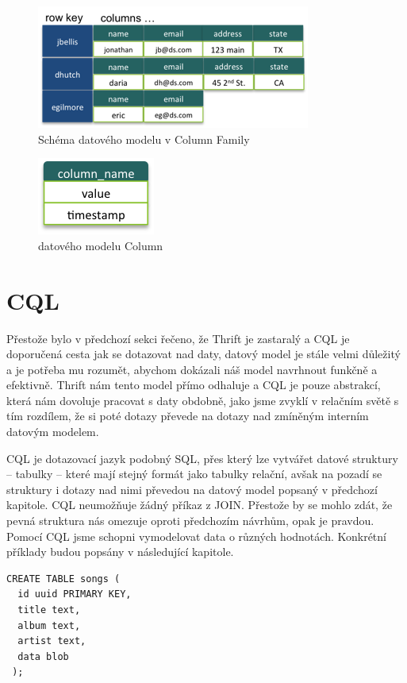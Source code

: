 \begin{figure}[!h]
\centering
\includegraphics[scale=0.95]{images/static_column_family}
\caption{Schéma datového modelu v Column Family}
\label{fig:vnodes}
\end{figure}

\begin{figure}[!h]
\centering
\includegraphics[scale=1.5]{images/column}
\caption{datového modelu Column}
\label{fig:vnodes}
\end{figure}

\section{CQL}
Přestože bylo v předchozí sekci řečeno, že Thrift je zastaralý a CQL je doporučená cesta jak se dotazovat nad daty, datový model je stále velmi důležitý a je potřeba mu rozumět, abychom dokázali náš model navrhnout funkčně a efektivně. Thrift nám tento model přímo odhaluje a CQL je pouze abstrakcí, která nám dovoluje pracovat s daty obdobně, jako jsme zvyklí v relačním světě s tím rozdílem, že si poté dotazy převede na dotazy nad zmíněným interním datovým modelem. 

CQL je dotazovací jazyk podobný SQL, přes který lze vytvářet datové struktury – tabulky – které mají stejný formát jako tabulky relační, avšak na pozadí se struktury i dotazy nad nimi převedou na datový model popsaný v předchozí kapitole. CQL neumožňuje žádný příkaz z  JOIN. Přestože by se mohlo zdát, že pevná struktura nás omezuje oproti předchozím návrhům, opak je pravdou. Pomocí CQL jsme schopni vymodelovat data o různých hodnotách. Konkrétní příklady budou popsány v následující kapitole. 

\newpage

\begin{lstlisting}[caption={Tvorba jednoduché tabulky pomocí CQL},label=CQL1]
CREATE TABLE songs (
  id uuid PRIMARY KEY,
  title text,
  album text,
  artist text,
  data blob
 );
\end{lstlisting}

